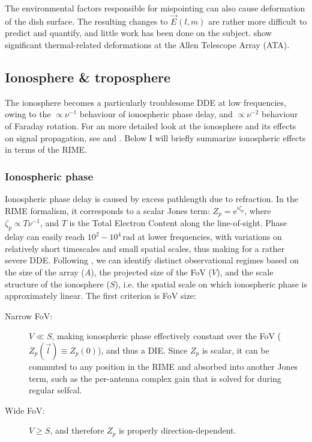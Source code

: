 \documentclass{aa}
\newcommand{\jones}[2]{\vec {#1}_{#2}}
\begin{document}
The environmental factors responsible for mispointing can also cause deformation of the dish surface. The resulting changes to $\jones{E}{}(l,m)$ are rather more difficult to predict and quantify, and little work has been done on the subject. \citet{Harp:ATA-beams} show significant thermal-related deformations at the Allen Telescope Array (ATA).

\subsection{Ionosphere \& troposphere}

The ionosphere becomes a particularly troublesome DDE at low frequencies, owing to the $\propto\nu^{-1}$ behaviour of ionospheric phase delay, and $\propto\nu^{-2}$ behaviour of Faraday rotation. For an more detailed look at the ionosphere and its effects on signal propagation, see \citet[Sect.~13.3]{tms} and \citet{Intema:SPAM}. Below I will briefly summarize ionospheric effects in terms of the RIME.

\subsubsection{Ionospheric phase}

Ionospheric phase delay is caused by excess pathlength due to refraction. In the RIME formalism, it corresponds to a scalar Jones term: $Z_p=\mathrm{e}^{i\zeta_p}$, where $\zeta_p\propto T \nu^{-1}$, and $T$ is the Total Electron Content along the line-of-sight. Phase delay can easily reach $10^2-10^4\,\mathrm{rad}$ at lower frequencies, with variations on relatively short timescales and small spatial scales, thus making for a rather severe DDE. Following \citet{Lonsdale:4regimes}, we can identify distinct observational regimes based on the size of the array ($A$), the projected size of the FoV ($V$), and the scale structure of the ionosphere ($S$), i.e. the spatial scale on which ionospheric phase is approximately linear. The first criterion is FoV size:

\begin{description}
\item[Narrow FoV:] $V\ll S$, making ionospheric phase effectively constant over the FoV ($Z_p(\vec l)\equiv Z_p(0)$), and thus a DIE.
Since $Z_p$ is scalar, it can be commuted to any position in the RIME and absorbed into another Jones term, such as the per-antenna complex gain that is solved for during regular selfcal.
\item[Wide FoV:] $V\ge S$, and therefore $Z_p$ is properly direction-dependent.
\end{description}
\end{document}
